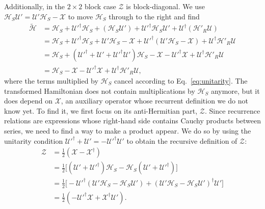 Additionally, in the $2\times 2$ block case $\mathcal{Z}$ is block-diagonal.
We use $\mathcal{H}_{S} \mathcal{U}' = \mathcal{U}' \mathcal{H}_{S} -\mathcal{X}$ to move $\mathcal{H}_{S}$ through to the right and find
%
\begin{equation}
\label{eq:H_tilde}
\begin{aligned}
  \tilde{\mathcal{H}}
  &= \mathcal{H}_{S} + \mathcal{U}'^\dagger \mathcal{H}_{S} + (\mathcal{H}_{S} \mathcal{U}') + \mathcal{U}'^\dagger \mathcal{H}_{S}
  \mathcal{U}' + \mathcal{U}^\dagger(\mathcal{H}'_{R}\mathcal{U})
  \\
  &= \mathcal{H}_{S} + \mathcal{U}'^\dagger \mathcal{H}_{S} + \mathcal{U}'\mathcal{H}_{S} - \mathcal{X} + \mathcal{U}'^\dagger (\mathcal{U}' \mathcal{H}_{S} - \mathcal{X}) + \mathcal{U}^\dagger\mathcal{H}'_{R}\mathcal{U} \\
  &= \mathcal{H}_{S} + (\mathcal{U}'^\dagger + \mathcal{U}' + \mathcal{U}'^\dagger \mathcal{U}')\mathcal{H}_{S} - \mathcal{X} - \mathcal{U}'^\dagger \mathcal{X} + \mathcal{U}^\dagger\mathcal{H}'_{R}\mathcal{U} \\
  &= \mathcal{H}_{S} - \mathcal{X} - \mathcal{U}'^\dagger \mathcal{X} + \mathcal{U}^\dagger\mathcal{H}'_{R}\mathcal{U},
\end{aligned}
\end{equation}
%
where the terms multiplied by $\mathcal{H}_{S}$ cancel according to Eq.~\eqref{eq:unitarity}.
The transformed Hamiltonian does not contain multiplications by $\mathcal{H}_{S}$ anymore, but it does depend on $\mathcal{X}$, an auxiliary operator whose recurrent definition we do not know yet.
To find it, we first focus on its anti-Hermitian part, $\mathcal{Z}$.
Since recurrence relations are expressions whose right-hand side contains Cauchy products between series, we need to find a way to make a product appear.
We do so by using the unitarity condition $\mathcal{U}'^\dagger + \mathcal{U}' = -\mathcal{U}'^\dagger \mathcal{U}'$ to obtain the recursive definition of $\mathcal{Z}$:
%
\begin{equation}
\label{eq:Z}
\begin{aligned}
\mathcal{Z}
&= \frac{1}{2} (\mathcal{X} - \mathcal{X}^{\dagger}) \\
&= \frac{1}{2}\Big[ (\mathcal{U}' + \mathcal{U}'^{\dagger}) \mathcal{H}_{S} - \mathcal{H}_{S} (\mathcal{U}' + \mathcal{U}'^{\dagger}) \Big] \\
&= \frac{1}{2} \Big[ - \mathcal{U}'^{\dagger} (\mathcal{U}'\mathcal{H}_{S} - \mathcal{H}_{S} \mathcal{U}') + (\mathcal{U}'\mathcal{H}_{S} - \mathcal{H}_{S} \mathcal{U}')^{\dagger} \mathcal{U}' \Big] \\
&= \frac{1}{2} (-\mathcal{U}'^{\dagger} \mathcal{X} + \mathcal{X}^{\dagger} \mathcal{U}').
\end{aligned}
\end{equation}
